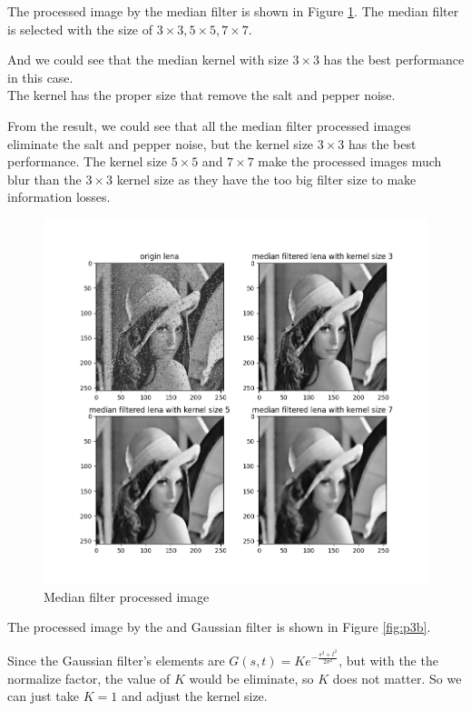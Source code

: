 \problem{}
The processed image by the median filter is shown in Figure \ref{fig:p3a}.
The median filter is selected with the size of $3\times 3, 5\times 5, 7\times 7$.

And we could see that the median kernel with size $3 \times 3$ has the best performance in this case.\\
The kernel has the proper size that remove the salt and pepper noise.

From the result, we could see that all the median filter processed images eliminate the salt and pepper noise, but the kernel size $3 \times 3$ has the best performance. The kernel size $5 \times 5$ and $7 \times 7$ make the 
processed images much blur than the $3 \times 3$ kernel size as they have the too big filter size to make information losses.

\begin{figure}[htbp]
    \centering
	\includegraphics[width=\textwidth]{../images/p3/p3a.png}
    \caption{Median filter processed image}
\label{fig:p3a}
\end{figure}

The processed image by the and Gaussian filter is shown in Figure \ref{fig:p3b}.

Since the Gaussian filter's elements are $G(s,t)=Ke^{-\frac{s^2+t^2}{2\sigma^2}}$, but with the the normalize factor, the value of
$K$ would be eliminate, so $K$ does not matter. So we can just take $K=1$ and adjust the kernel size.

